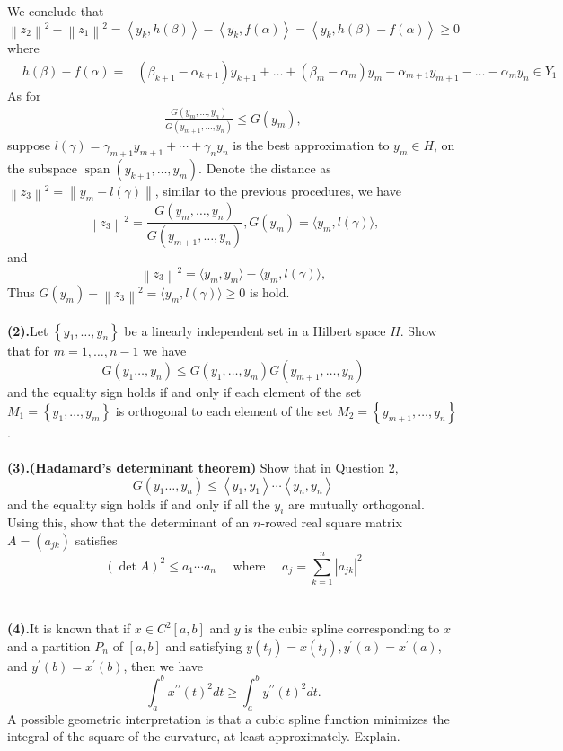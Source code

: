 \documentclass{homework}
\begin{document}
We conclude that
$$
\left\|z_2\right\|^2-\left\|z_1\right\|^2=\left\langle y_k, h(\beta)\right\rangle-\left\langle y_k, f(\alpha)\right\rangle=\left\langle y_k, h(\beta)-f(\alpha)\right\rangle \geq 0
$$
where
$$
\begin{aligned}
&h(\beta)-f(\alpha)=
&\left(\beta_{k+1}-\alpha_{k+1}\right) y_{k+1}+\ldots+\left(\beta_m-\alpha_m\right) y_m-\alpha_{m+1} y_{m+1}-\ldots-\alpha_m y_n \in Y_1
\end{aligned}
$$
As for 
$$
\begin{aligned}
\frac{G\left(y_m, \ldots, y_n\right)}{G\left(y_{m+1}, \ldots, y_n\right)} \le G\left(y_m\right), 
\end{aligned}
$$
 suppose $l(\gamma)=\gamma_{m+1}y_{m+1}+\cdots+\gamma_{n}y_n$ is the best approximation to $y_m \in H$, on the subspace $\operatorname{span}\left(y_{k+1}, \ldots, y_m\right)$. Denote the distance as $\left\|z_3\right\|^2=\left\|y_m-l(\gamma)\right\|$, similar to the previous procedures, we have 
$$
    \left\|z_3\right\|^2=\frac{G\left(y_m, \ldots, y_n\right)}{G\left(y_{m+1}, \ldots, y_n\right)}, 
    G\left(y_m \right)=\langle y_m, l\left( \gamma \right) \rangle ,
$$
and 
$$ \left\|z_3\right\|^2 = \langle y_m, y_m\rangle - \langle y_m, l\left( \gamma \right)\rangle, $$
Thus $ G\left(y_m \right) - \left\|z_3\right\|^2 = \langle y_m, l\left( \gamma \right)\rangle \ge 0$ is hold.  
\\
\\
\textbf{(2).}Let $\left\{y_1, \ldots, y_n\right\}$ be a linearly independent set in a Hilbert space $H$. Show that for $m=1, \ldots, n-1$ we have
$$
G\left(y_1 \ldots, y_n\right) \le G\left(y_1, \ldots, y_m\right) G\left(y_{m+1}, \ldots, y_n\right)
$$
and the equality sign holds if and only if each element of the set $M_1=\left\{y_1, \ldots, y_m\right\}$ is orthogonal to each element of the set $M_2=\left\{y_{m+1}, \ldots, y_n\right\}$.
\\
\\
\textbf{(3).(Hadamard's determinant theorem)} Show that in Question 2,
$$
G\left(y_1 \ldots, y_n\right) \le\left\langle y_1, y_1\right\rangle \cdots\left\langle y_n, y_n\right\rangle
$$
and the equality sign holds if and only if all the $y_i$ are mutually orthogonal. Using this, show that the determinant of an $n$-rowed real square matrix $A=\left(a_{j k}\right)$ satisfies
$$
(\operatorname{det} A)^2 \le a_1 \cdots a_n \quad \text { where } \quad a_j=\sum_{k=1}^n\left|a_{j k}\right|^2 
$$
\\
\\
\textbf{(4).}It is known that if $x \in C^2[a, b]$ and $y$ is the cubic spline corresponding to $x$ and a partition $P_n$ of $[a, b]$ and satisfying $y\left(t_j\right)=x\left(t_j\right), y^{\prime}(a)=x^{\prime}(a)$, and $y^{\prime}(b)=x^{\prime}(b)$, then we have
$$
\int_a^b x^{\prime \prime}(t)^2 d t \ge \int_a^b y^{\prime \prime}(t)^2 d t .
$$
A possible geometric interpretation is that a cubic spline function minimizes the integral of the square of the curvature, at least approximately. Explain.
\end{document}
